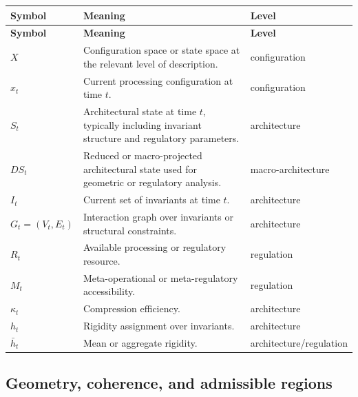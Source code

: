 \documentclass[11pt,a4paper]{article}
\begin{document}
	\begin{longtable}{>{\RaggedRight\arraybackslash}p{}
			>{\RaggedRight\arraybackslash}p{}
			>{\RaggedRight\arraybackslash}p{}}
		\toprule
		\textbf{Symbol} & \textbf{Meaning} & \textbf{Level} \\
		\midrule
		\endfirsthead
		\toprule
		\textbf{Symbol} & \textbf{Meaning} & \textbf{Level} \\
		\midrule
		\endhead
		
		$X$ & Configuration space or state space at the relevant level of description. & configuration \\
		
		$x_t$ & Current processing configuration at time $t$. & configuration \\
		
		$S_t$ & Architectural state at time $t$, typically including invariant structure and regulatory parameters. & architecture \\
		
		$DS_t$ & Reduced or macro-projected architectural state used for geometric or regulatory analysis. & macro-architecture \\
		
		$I_t$ & Current set of invariants at time $t$. & architecture \\
		
		$G_t=(V_t,E_t)$ & Interaction graph over invariants or structural constraints. & architecture \\
		
		$R_t$ & Available processing or regulatory resource. & regulation \\
		
		$M_t$ & Meta-operational or meta-regulatory accessibility. & regulation \\
		
		$\kappa_t$ & Compression efficiency. & architecture \\
		
		$h_t$ & Rigidity assignment over invariants. & architecture \\
		
		$\bar h_t$ & Mean or aggregate rigidity. & architecture/regulation \\
		
		\bottomrule
	\end{longtable}
	
	\subsection{Geometry, coherence, and admissible regions}
	
\end{document}

